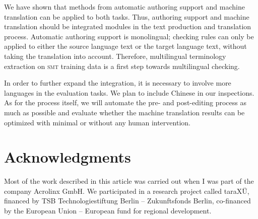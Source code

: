 \documentclass[output=paper]{LSP/langsci}
\begin{document}
We have shown that methods from automatic authoring support and machine translation can be applied to both tasks. Thus, authoring support and machine translation should be integrated modules in the text production and translation process. Automatic authoring support is monolingual; checking rules can only be applied to either the source language text or the target language text, without taking the translation into account. Therefore, multilingual terminology extraction on \textsc{smt} training data is a first step towards multilingual checking.

In order to further expand the integration, it is necessary to involve more languages in the evaluation tasks. We plan to include Chinese in our inspections. As for the process itself, we will automate the pre- and post-editing process as much as possible and evaluate whether the machine translation results can be optimized with minimal or without any human intervention.

\section*{Acknowledgments}\label{sec:siegel:8}

Most of the work described in this article was carried out when I was part of the company Acrolinx GmbH. We participated in a research project called taraXÜ, financed by TSB Technologiestiftung Berlin -- Zukunftsfonds Berlin, co-financed by the European Union -- European fund for regional development.

\sloppy
\printbibliography[heading=subbibliography,notkeyword=this]
\end{document}
